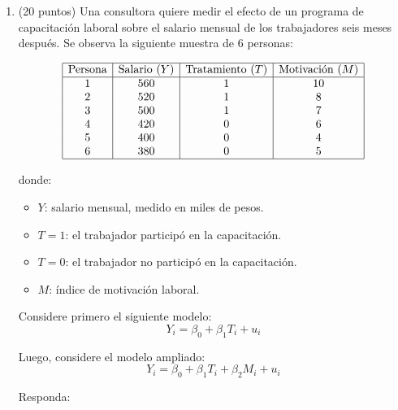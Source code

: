 \documentclass[10pt,a4paper]{article}
\begin{document}
\begin{enumerate}

      \item (20 puntos) Una consultora quiere medir el efecto de un programa de capacitación laboral sobre el salario mensual de los trabajadores seis meses después. Se observa la siguiente muestra de 6 personas:

    \[
    \begin{array}{|c|c|c|c|}
    \hline
    \text{Persona} & \text{Salario } (Y) & \text{Tratamiento } (T) & \text{Motivación } (M)\\
    \hline
    1 & 560 & 1 & 10\\
    2 & 520 & 1 & 8\\
    3 & 500 & 1 & 7\\
    4 & 420 & 0 & 6\\
    5 & 400 & 0 & 4\\
    6 & 380 & 0 & 5 \\
    \hline
    \end{array}
    \]

    donde:
    \begin{itemize}
        \item \(Y\): salario mensual, medido en miles de pesos.
        \item \(T=1\): el trabajador participó en la capacitación.
        \item \(T=0\): el trabajador no participó en la capacitación.
        \item \(M\): índice de motivación laboral.
    \end{itemize}

    Considere primero el siguiente modelo:
    \[
    Y_i=\beta_0+\beta_1 T_i+u_i
    \]

    Luego, considere el modelo ampliado:
    \[
    Y_i=\beta_0+\beta_1 T_i+\beta_2 M_i+u_i
    \]

    Responda:


\end{enumerate}
\end{document}
